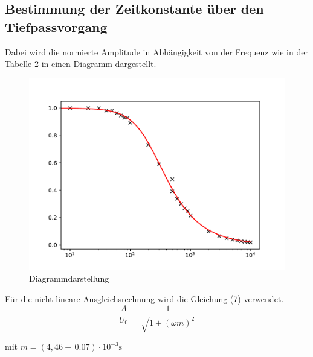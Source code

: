 \subsection{Bestimmung der Zeitkonstante über den Tiefpassvorgang}
Dabei wird die normierte Amplitude in Abhängigkeit von der Frequenz wie in der Tabelle 2 in
einen Diagramm dargestellt.

\begin{figure}[H]
  \centering
  \includegraphics[width=\textwidth]{Diagramm2.pdf}
  \caption{Diagrammdarstellung}
  \label{fig:2}
\end{figure}
Für die nicht-lineare Ausgleichsrechnung wird die Gleichung (7) verwendet.
\begin{equation*}
  \frac{A}{U_0} = \frac{1}{\sqrt{1 + (\omega m)^2}}
\end{equation*}
\centerline{mit $m = (4,46 \pm \, 0.07) \cdot 10^{-3} \si{\second}$}

